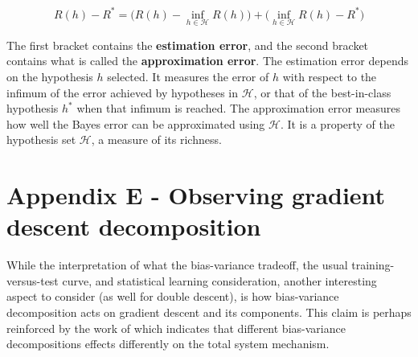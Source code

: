 \documentclass[10pt]{article} %
\begin{document}
\begin{equation}
    R(h) - R^{*} = \Big( R(h) - \inf_{h\in \mathcal{H}} R(h) \Big) + \Big( \inf_{h\in \mathcal{H}} R(h) - R^{*} \Big)
\end{equation}

The first bracket contains the \textbf{estimation error}, and the second bracket contains what is called the \textbf{approximation error}. The estimation error depends on the hypothesis $h$ selected. It measures the error of $h$ with respect to the infimum of the error achieved by hypotheses in $\mathcal{H}$, or that of the best-in-class hypothesis $h^{*}$ when that infimum is reached. The approximation error measures how well the Bayes error can be approximated using $\mathcal{H}$. It is a property of the hypothesis set $\mathcal{H}$, a measure of its richness. 

\section*{Appendix E - Observing gradient descent decomposition}

While the interpretation of what the bias-variance tradeoff, the usual training-versus-test curve, and statistical learning consideration, another interesting aspect to consider (as well for double descent), is how bias-variance decomposition acts on gradient descent and its components. This claim is perhaps reinforced by the work of \cite{adlam2020understandingdoubledescentrequires} which indicates that different bias-variance decompositions effects differently on the total system mechanism. 
\end{document}
